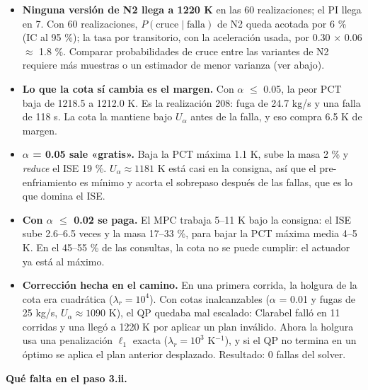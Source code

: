 \documentclass[11pt,a4paper]{article}
\begin{document}
\begin{itemize}
\item \textbf{Ninguna versión de N2 llega a 1220 K} en las 60 realizaciones; el PI llega en 7. Con 60 realizaciones, $P(\text{cruce}\mid\text{falla})$ de N2 queda acotada por 6 \% (IC al 95 \%); la tasa por transitorio, con la aceleración usada, por 0.30 $\times$ 0.06 $\approx$ 1.8 \%. Comparar probabilidades de cruce entre las variantes de N2 requiere más muestras o un estimador de menor varianza (ver abajo).
\item \textbf{Lo que la cota sí cambia es el margen.} Con $\alpha$ $\le$ 0.05, la peor PCT baja de 1218.5 a 1212.0 K. Es la realización 208: fuga de 24.7 kg/s y una falla de 118 s. La cota la mantiene bajo $U_\alpha$ antes de la falla, y eso compra 6.5 K de margen.
\item \textbf{$\alpha$ = 0.05 sale «gratis».} Baja la PCT máxima 1.1 K, sube la masa 2 \% y \emph{reduce} el ISE 19 \%. $U_\alpha\approx1181$ K está casi en la consigna, así que el pre-enfriamiento es mínimo y acorta el sobrepaso después de las fallas, que es lo que domina el ISE.
\item \textbf{Con $\alpha$ $\le$ 0.02 se paga.} El MPC trabaja 5–11 K bajo la consigna: el ISE sube 2.6–6.5 veces y la masa 17–33 \%, para bajar la PCT máxima media 4–5 K. En el 45–55 \% de las consultas, la cota no se puede cumplir: el actuador ya está al máximo.
\item \textbf{Corrección hecha en el camino.} En una primera corrida, la holgura de la cota era cuadrática ($\lambda_r=10^4$). Con cotas inalcanzables ($\alpha$ = 0.01 y fugas de 25 kg/s, $U_\alpha\approx1090$ K), el QP quedaba mal escalado: Clarabel falló en 11 corridas y una llegó a 1220 K por aplicar un plan inválido. Ahora la holgura usa una penalización $\ell_1$ exacta ($\lambda_r=10^3$ K$^{-1}$), y si el QP no termina en un óptimo se aplica el plan anterior desplazado. Resultado: 0 fallas del solver.
\end{itemize}

\textbf{Qué falta en el paso 3.ii.}
\end{document}
